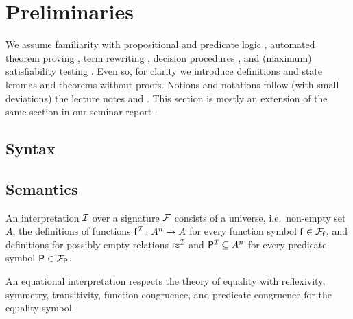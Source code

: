 
\chapter{Preliminaries}

We assume familiarity with propositional and predicate logic \cite{Huth:2004:LCS:975331}, 
automated theorem proving \cite{Fitting:1996:FLA:230183}, 
term rewriting \cite{Baader:1998:TR:280474}, 
decision procedures \cite{Kroening:2008:DPA:1391237}, 
and (maximum) satisfiability testing \cite{Biere:2009:HSV:1550723}.
Even so, for clarity we introduce
definitions and state lemmas and theorems without proofs.
Notions and notations follow (with small deviations) the lecture notes \cite{AM2015tr} and \cite{GM2013ar}.
This section is mostly an extension of the same section in our seminar report \cite{axm:SR2}.

\section{Syntax}
















\section{Semantics}

\begin{definition}
	An {\myem interpretation} ${\mathcal I}$ over a signature ${\mathcal F}$ consists 
	of a {\myem universe}, i.e.~non-empty set  $A$,
	the definitions of functions ${\mathsf f}^{\mathcal I}: A^n\rightarrow A$  for every function symbol ${\mathsf f}\in{{\mathcal F}_{\mathsf f}}$, 
	and definitions for possibly empty relations $\approx^{\mathcal I}$ and ${\mathsf P}^{\mathcal I}\subseteq A^n$ for every predicate symbol ${\mathsf P}\in{{\mathcal F}_{\mathsf P}}$.
	
	An {\myem equational} interpretation respects the theory of equality
	with reflexivity, symmetry, transitivity, function congruence, and predicate congruence
	for the equality symbol.
\end{definition}

